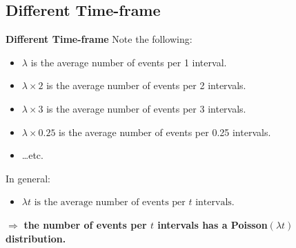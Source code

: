 \documentclass[compress]{beamer}        %
\makeatletter
\newcommand{\tcb}{\textcolor{beamer@blendedblue}}
\makeatother
\begin{document}
\subsection{Different Time-frame}
\begin{frame}{\bf \tcb{Different Time-frame}}
Note the following:\\
\begin{itemize}\itemsep0.2cm
\item $\lambda$ is the average number of events per 1 interval.
\item $\lambda \times 2$ is the average number of events per 2 intervals.
\item $\lambda \times 3$ is the average number of events per 3 intervals.
\item $\lambda \times 0.25$ is the average number of events per 0.25 intervals.
\item \ldots etc.\\[0.5cm]
\end{itemize}

In general:
\begin{itemize}
\item $\boxed{\lambda t \text{ is the average number of events per } t \text{ intervals}}$.\\[0.5cm]
\end{itemize}

$\Rightarrow$ {\bf the number of events per {\boldmath$t$} intervals has a Poisson{\boldmath$(\lambda t)$} distribution.}

\end{frame}
\end{document}

